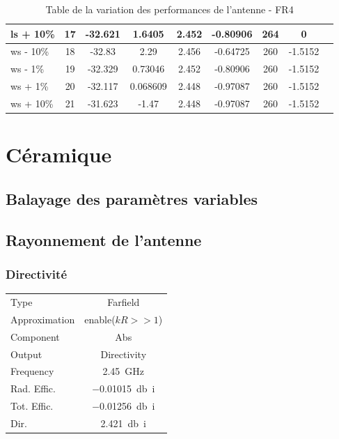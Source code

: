 \documentclass[Deriaz_Traiber_Labo02]{subfiles}
\begin{document}
\begin{table}[H]
\begin{tabular}{|l|c|cc|cc|cc|c|}
    ls + 10\%   & 17  &  -32.621  &     1.6405  &  2.452  &   -0.80906 &    264  &          0\\\hline
    ws - 10\%   & 18  &  -32.83   &      2.29   & 2.456   &  -0.64725  &   260   &   -1.5152\\
    ws - 1\%    & 19  &  -32.329  &    0.73046  &  2.452  &   -0.80906 &    260  &    -1.5152\\
    ws + 1\%    & 20  &  -32.117  &   0.068609  &  2.448  &   -0.97087 &    260  &    -1.5152\\
    ws + 10\%   & 21  &  -31.623  &      -1.47  &  2.448  &   -0.97087 &    260  &    -1.5152\\\hline
\end{tabular}
\caption{Table de la variation des performances de l'antenne - FR4}
\label{tab:param-sweep-fr4}
\end{table}

\section{Céramique}

\subsection{Balayage des paramètres variables}



\subsection{Rayonnement de l'antenne}
\subsubsection{Directivité}

\begin{table}[H]
\centering
\begin{tabular}{l c}\hline
Type				& Farfield\\
Approximation	& enable($kR>>1$)\\
Component		& Abs\\
Output			& Directivity\\
Frequency		& \SI{2.45}{\giga\hertz}\\
Rad. Effic.		& \SI{-0.01015}{\decibel i}\\
Tot. Effic.		& \SI{-0.01256}{\decibel i}\\
Dir.				& \SI{2.421}{\decibel i}\\\hline
\end{tabular}
\end{table}
\end{document}
